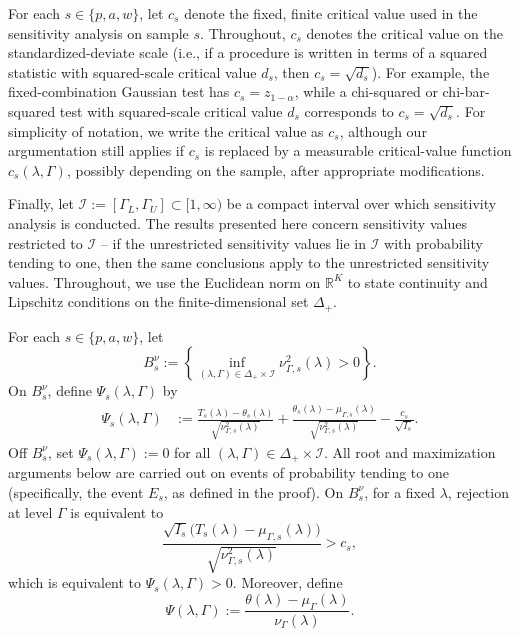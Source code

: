 \documentclass[12pt,leqno,titlepage]{amsart}
\newcommand{\1}{\mathbbm{1}}
\begin{document}
\begin{bibunit}
{For each \(s\in\{p,a,w\}\), let \(c_s\) denote the fixed, finite critical value used in the sensitivity analysis on sample $s$. Throughout, \(c_s\) denotes the critical value on the standardized-deviate scale (i.e., if a procedure is written in terms of a squared statistic with squared-scale critical 
value \(d_s\), then \(c_s=\sqrt{d_s}\)). For example, the fixed-combination Gaussian test has 
\(c_s=z_{1-\alpha}\), while a chi-squared or chi-bar-squared test with squared-scale 
critical value \(d_s\) corresponds to \(c_s=\sqrt{d_s}\). For simplicity of notation, we write the critical value as \(c_s\), although our argumentation still applies
if \(c_s\) is replaced by a measurable critical-value function \(c_s(\lambda,\Gamma)\), possibly depending on the sample, after appropriate modifications.

Finally, let \(\mathcal I:=[\Gamma_L,\Gamma_U]\subset[1,\infty)\) be a compact interval over which sensitivity analysis is conducted. The results presented here concern sensitivity values restricted to \(\mathcal I\) -- if the unrestricted sensitivity values lie in \(\mathcal I\) with probability tending to one, then the same conclusions apply to the unrestricted sensitivity values. Throughout, we use the Euclidean norm on \(\mathbb R^K\) to state continuity and Lipschitz conditions on the finite-dimensional set \(\Delta_+\).%

For each \(s\in\{p,a,w\}\), let
\[
B_s^\nu
:=
\left\{
\inf_{(\lambda,\Gamma)\in\Delta_+\times\mathcal I}
\nu_{\Gamma,s}^2(\lambda)>0
\right\}.
\]
On \(B_s^\nu\), define \(\Psi_s(\lambda,\Gamma)\) by
\begin{align*}
\Psi_s(\lambda,\Gamma)
&:=
\frac{T_s(\lambda)-\theta_s(\lambda)}{\sqrt{\nu_{\Gamma,s}^2(\lambda)}}
+
\frac{\theta_s(\lambda)-\mu_{\Gamma,s}(\lambda)}{\sqrt{\nu_{\Gamma,s}^2(\lambda)}}
-
\frac{c_s}{\sqrt{I_s}}.
\end{align*}
Off \(B_s^\nu\), set \(\Psi_s(\lambda,\Gamma):=0\) for all
\((\lambda,\Gamma)\in\Delta_+\times\mathcal I\). All root and maximization
arguments below are carried out on events of probability tending to one (specifically, the event \(E_s\), as defined in the proof). On \(B_s^\nu\), for a fixed \(\lambda\), rejection at level \(\Gamma\) is 
equivalent to
\[
\frac{\sqrt{I_s}\bigl(T_s(\lambda)-\mu_{\Gamma,s}(\lambda)\bigr)}
{\sqrt{\nu_{\Gamma,s}^2(\lambda)}}
> c_s,
\]
which is equivalent to
$
\Psi_s(\lambda,\Gamma)>0.$ Moreover, define
\[
\Psi(\lambda,\Gamma)
:=
\frac{\theta(\lambda)-\mu_\Gamma(\lambda)}{\nu_\Gamma(\lambda)}.
\]

}
\end{bibunit}
\end{document}
